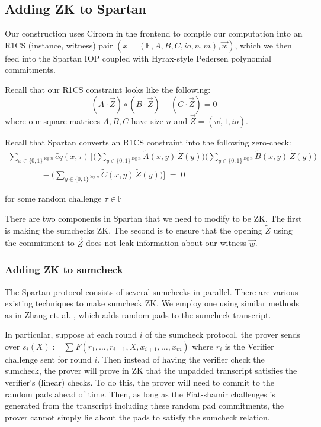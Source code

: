 \subsection{Adding ZK to Spartan}

Our construction uses Circom in the frontend to compile our computation into an R1CS (instance, witness) pair $(x=(\mathbb{F}, A, B, C, io, n, m), \vec{w})$, 
which we then feed into the Spartan IOP coupled with Hyrax-style Pedersen polynomial commitments.

Recall that our R1CS constraint looks like the following:
$$
(A \cdot \vec{Z}) \circ (B \cdot \vec{Z}) - (C \cdot \vec{Z}) = 0
$$
where our square matrices $A, B, C$ have size $n$ and $\vec{Z} = (\vec{w}, 1, io)$.

Recall that Spartan converts an R1CS constraint into the following zero-check:
\begin{multline*}
\sum_{x \in \{0,1\}^{\log n}} \widetilde{eq}(x, \tau)\,
\bigg[
\bigg(\sum_{y \in \{0,1\}^{\log n}} \widetilde{A}(x,y)\,\widetilde{Z}(y)\bigg)
\bigg(\sum_{y \in \{0,1\}^{\log n}} \widetilde{B}(x,y)\,\widetilde{Z}(y)\bigg) \\
\qquad\qquad
- \bigg(\sum_{y \in \{0,1\}^{\log n}} \widetilde{C}(x,y)\,\widetilde{Z}(y)\bigg)
\bigg] \;=\; 0
\end{multline*}

for some random challenge $\tau \in \mathbb{F}$

There are two components in Spartan that we need to modify to be ZK. 
The first is making the sumchecks ZK. 
The second is to ensure that the opening $\widetilde{Z}$ using the commitment to $\vec{Z}$ does not leak information about our witness $\vec{w}$.

\subsubsection{Adding ZK to sumcheck}

The Spartan protocol consists of several sumchecks in parallel. There are various existing techniques to make sumcheck ZK. 
We employ one using similar methods as in Zhang et. al. \cite{cryptoeprint:2019/1482}, which adds random pads to the sumcheck transcript.

In particular, suppose at each round $i$ of the sumcheck protocol, the prover sends over $s_i(X) := \sum_{} F(r_1, \dots, r_{i-1}, X, x_{i+1}, \dots, x_m)$ 
where $r_i$ is the Verifier challenge sent for round $i$. Then instead of having the verifier check the sumcheck, the prover will prove in ZK that the unpadded transcript satisfies the verifier's (linear) checks.
To do this, the prover will need to commit to the random pads ahead of time. 
Then, as long as the Fiat-shamir challenges is generated from the transcript including these random pad commitments, the prover cannot simply lie about the pads to satisfy the sumcheck relation.


